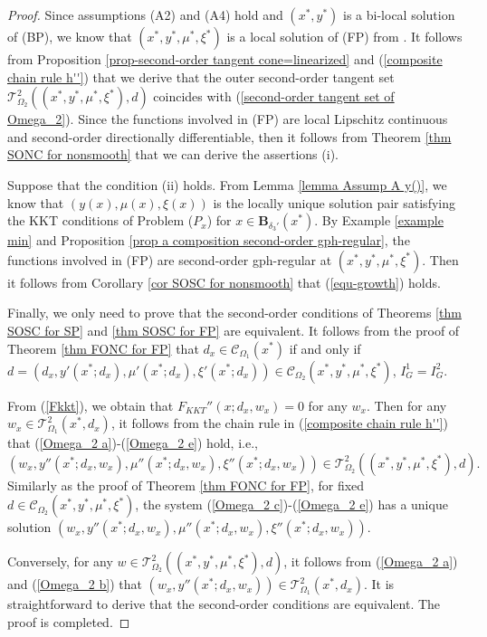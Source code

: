 \documentclass[11pt]{article}
\theoremstyle{definition}
\theoremstyle{remark}
\numberwithin{equation}{section}
\begin{document}
\begin{proof}
 Since assumptions  \textnormal{(A2)} and \textnormal{(A4)}  hold and  $(x^*,y^*)$ is a bi-local solution of (BP), we  know that
  $(x^*,y^*,\mu^*,\xi^*)$ is a local solution of (FP) from   \cite[Remark 3.6]{Liu 25}.
It follows from Proposition \ref{prop-second-order tangent cone=linearized} and (\ref{composite chain rule h''})
 that we derive that the outer second-order tangent set
 $\mathcal{T}_{\Omega_2}^2((x^*,y^*,\mu^*,\xi^*),d)$ coincides with (\ref{second-order tangent set of Omega_2}).
 Since the functions involved in (FP) are local Lipschitz continuous and
second-order directionally differentiable, then it follows from Theorem \ref{thm SONC for nonsmooth} that we can derive the
 assertions (i).

Suppose that the condition (ii) holds.  From Lemma \ref{lemma Assump A y()}, we know  that
$(y(x),\mu(x),\xi(x))$ is   the locally unique solution pair satisfying the KKT conditions of  Problem ($P_{x}$) for $x\in \boldsymbol{B}_{\delta_3'}(x^*)$.
By  Example \ref{example min} and  Proposition \ref{prop a composition
   second-order gph-regular},  the functions involved in (FP) are second-order gph-regular at $(x^*,y^*,\mu^*,\xi^*)$.
   Then it follows from %
 Corollary \ref{cor SOSC for nonsmooth}  that
 (\ref{equ-growth}) holds.

Finally, we only need to prove that the second-order conditions of Theorems \ref{thm SOSC for SP} and \ref{thm SOSC for FP} are equivalent.
It follows from the proof of Theorem \ref{thm FONC for FP} that
$d_x\in \mathcal{C}_{\Omega_1}(x^*)$ if and only if $d=(d_x,y'(x^*;d_x),\mu'(x^*;d_x),\xi'(x^*;d_x))\in
\mathcal{C}_{\Omega_2}(x^*,y^*,\mu^*,\xi^*)$, $I_G^1=I_G^2$.

From (\ref{Fkkt}), we obtain that $F_{KKT}''(x;d_x,w_x)=0$ for any $w_x$.
Then for any $w_x\in \mathcal{T}_{\Omega_1}^2(x^*,d_x)$, it follows from the chain rule in  (\ref{composite chain rule h''}) that  (\ref{Omega_2 a})-(\ref{Omega_2 e}) hold, i.e.,
 $$(w_x,y''(x^*;d_x,w_x),\mu''(x^*;d_x,w_x),\xi''(x^*;d_x,w_x))\in
  \mathcal{T}_{\Omega_2}^2((x^*,y^*,\mu^*,\xi^*),d).$$
Similarly as the proof of  Theorem \ref{thm FONC for FP}, for fixed $d\in \mathcal{C}_{\Omega_2}(x^*,y^*,\mu^*,\xi^*)$,  the system (\ref{Omega_2 c})-(\ref{Omega_2 e}) has a unique solution $(w_x,y''(x^*;d_x,w_x),\mu''(x^*;d_x,w_x),\xi''(x^*;d_x,w_x))$.

 Conversely, for any $w\in \mathcal{T}_{\Omega_2}^2((x^*,y^*,\mu^*,\xi^*),d)$, it follows from (\ref{Omega_2 a}) and (\ref{Omega_2 b}) that
 $(w_x,y''(x^*;d_x,w_x))\in \mathcal{T}_{\Omega_1}^2(x^*,d_x)$.
  It
is straightforward to derive that the second-order conditions are equivalent.
The proof is completed.
\end{proof}
\end{document}
